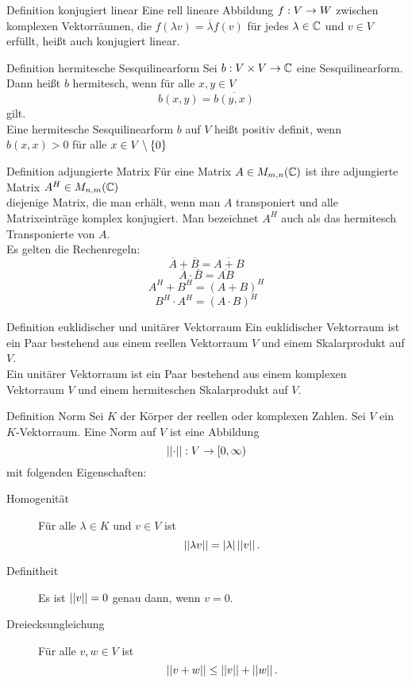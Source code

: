 \documentclass[main.tex]{subfiles}
\begin{document}
\begin{karte}{Definition konjugiert linear}
    Eine rell lineare Abbildung \(f : V \rightarrow W\) zwischen komplexen Vektorräumen,
    die \(f(\lambda v) = \overline{\lambda}f(v)\) für jedes \(\lambda \in \mathbb{C}\)
    und \(v \in V\) erfüllt, heißt auch konjugiert linear.
\end{karte}

\begin{karte}{Definition hermitesche Sesquilinearform}
    Sei \(b : V\times V \rightarrow \mathbb{C}\) eine Sesquilinearform. Dann heißt \(b\) hermitesch,
    wenn für alle \(x,y \in V\)
    \[ b(x,y) = \overline{b(y,x)} \]
    gilt.\\
    Eine hermitesche Sesquilinearform \(b\) auf \(V\) heißt positiv definit,
    wenn \(b(x,x) > 0\) für alle \(x \in V \setminus \{0\}\)
\end{karte}

\begin{karte}{Definition adjungierte Matrix}
    Für eine Matrix \(A \in M_{m,n}(\mathbb{C})\) ist ihre adjungierte Matrix \(A^H \in M_{n,m}(\mathbb{C})\)\\
    diejenige Matrix, die man erhält, wenn man \(A\) transponiert und alle Matrixeinträge 
    komplex konjugiert. Man bezeichnet \(A^H\) auch als das hermitesch Transponierte von \(A\).\\
    Es gelten die Rechenregeln:\\
    \[ \overline{A} + \overline{B} = \overline{A + B} \]
    \[ \overline{A} \cdot \overline{B} = \overline{AB} \]
    \[ A^H + B^H = (A + B)^H \]
    \[ B^H \cdot A^H = (A \cdot B)^H \]
\end{karte}

\begin{karte}{Definition euklidischer und unitärer Vektorraum}
    Ein euklidischer Vektorraum ist ein Paar bestehend aus einem reellen Vektorraum \(V\)
    und einem Skalarprodukt auf \(V\).\\
    Ein unitärer Vektorraum ist ein Paar bestehend aus einem komplexen Vektorraum \(V\) und
    einem hermiteschen Skalarprodukt auf \(V\).
\end{karte}

\begin{karte}{Definition Norm}
    Sei \(K\) der Körper der reellen oder komplexen Zahlen. Sei \(V\) ein \(K\)-Vektorraum.
    Eine Norm auf \(V\) ist eine Abbildung
    \[ \left|\left|\cdot\right|\right| : V \rightarrow [0, \infty) \]
    mit folgenden Eigenschaften:
    \begin{description}
        \item[Homogenität] Für alle \(\lambda \in K\) und \(v \in V\) ist 
        \[ \left|\left|\lambda v\right|\right| = \left| \lambda \right| \left|\left|v\right|\right|. \]
        \item[Definitheit] Es ist \(\left|\left|v\right|\right| = 0\) genau dann, wenn \(v = 0\).
        \item[Dreiecksungleichung] Für alle \(v, w \in V\) ist
        \[ \left|\left|v+w\right|\right| \leq \left|\left|v\right|\right| + \left|\left|w\right|\right|. \]   
    \end{description}
\end{karte}
\end{document}
